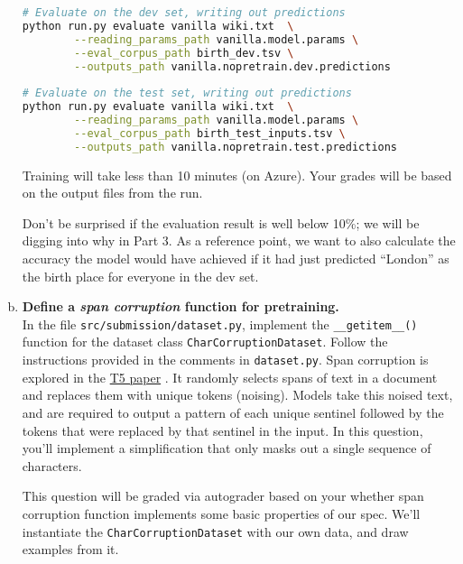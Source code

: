 \begin{enumerate}[(a)]
\begin{lstlisting}[language=bash]
# Evaluate on the dev set, writing out predictions
python run.py evaluate vanilla wiki.txt  \
        --reading_params_path vanilla.model.params \
        --eval_corpus_path birth_dev.tsv \
        --outputs_path vanilla.nopretrain.dev.predictions
        
# Evaluate on the test set, writing out predictions
python run.py evaluate vanilla wiki.txt  \
        --reading_params_path vanilla.model.params \
        --eval_corpus_path birth_test_inputs.tsv \
        --outputs_path vanilla.nopretrain.test.predictions
\end{lstlisting}

Training will take less than 10 minutes (on Azure). Your grades will be based on the output files from the run.

Don't be surprised if the evaluation result is well below 10\%; we will be digging into why in Part 3. As a reference point, we want to also calculate the accuracy the model would have achieved if it had just predicted ``London'' as the birth place for everyone in the dev set. 


\item {}  \textbf{Define a \textit{span corruption} function for pretraining.}\\
In the file \texttt{src/submission/dataset.py}, implement the \texttt{\_\_getitem\_\_()} function for the dataset class \texttt{CharCorruptionDataset}.
Follow the instructions provided in the comments in \texttt{dataset.py}.
Span corruption is explored in the \href{https://arxiv.org/pdf/1910.10683.pdf}{T5 paper} \cite{raffel2020exploring}.
It randomly selects spans of text in a document and replaces them with unique tokens (noising).
Models take this noised text, and are required to output a pattern of each unique sentinel followed by the tokens that were replaced by that sentinel in the input.
In this question, you'll implement a simplification that only masks out a single sequence of characters.

This question will be graded via autograder based on your whether span corruption function implements some basic properties of our spec.
We'll instantiate the \texttt{CharCorruptionDataset} with our own data, and draw examples from it.


\end{enumerate}
